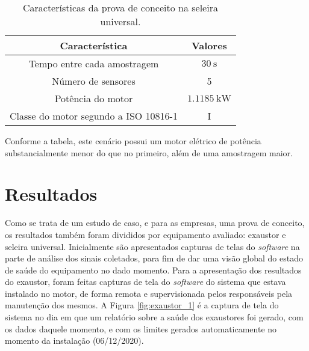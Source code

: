 \documentclass[a4paper]{ifacconf}
\begin{document}
\begin{table}[H]
    \caption{Características da prova de conceito na seleira universal.}
    \label{tab:seleira_universal}
    \centering%
    \begin{minipage}{.4\textwidth}
      \begin{tabular*}{\textwidth}{c|c}
        \hline
        Característica                          & Valores                                    \\ \hline
        \hline
        Tempo entre cada amostragem             &  $\SI{30}{\second}$                        \\
        Número de sensores                      &  5                                         \\ 
        Potência do motor                       &  $\SI{1.1185}{\kilo\watt}$                 \\
        Classe do motor segundo a  ISO 10816-1  &  I                                         \\
      \end{tabular*}
    \end{minipage}
  \end{table}

  Conforme a tabela, este cenário possui um motor elétrico de potência substancialmente menor do que no primeiro, além de uma amostragem maior.

\section{Resultados}

Como se trata de um estudo de caso, e para as empresas, uma prova de conceito, os resultados também foram divididos por equipamento avaliado:
exaustor e seleira universal. Inicialmente são apresentados capturas de telas do \textit{software} na parte de análise dos sinais 
coletados, para fim de dar uma visão global do estado de saúde do equipamento no dado momento. Para a apresentação dos resultados do exaustor,
foram feitas capturas de tela do \textit{software} do sistema que estava instalado no motor, de forma remota e supervisionada pelos 
responsáveis pela manutenção dos mesmos. A Figura \ref{fig:exaustor_1} é a captura de tela do sistema no dia em que um relatório sobre a saúde 
dos exaustores foi gerado, com os dados daquele momento, e com os limites gerados automaticamente no momento da instalação (06/12/2020).
\end{document}
